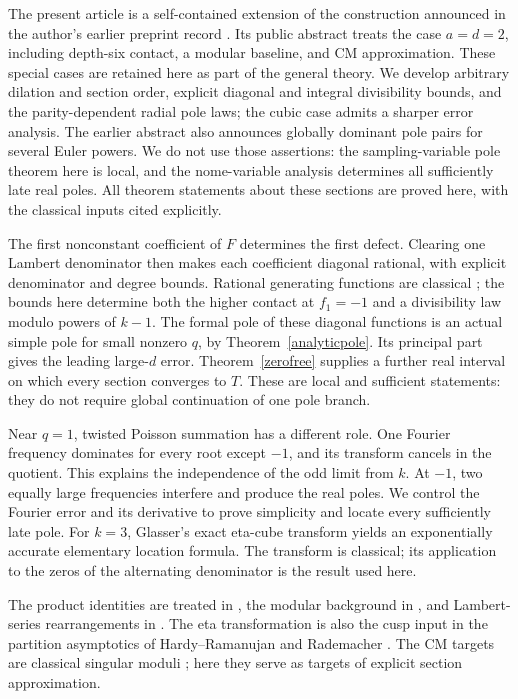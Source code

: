 \documentclass[11pt]{amsart}
\theoremstyle{definition}
\theoremstyle{remark}
\numberwithin{equation}{section}
\begin{document}
The present article is a self-contained extension of the construction announced in the author's earlier preprint record \cite{RaghavaEarlier}. Its public abstract treats the case $a=d=2$, including depth-six contact, a modular baseline, and CM approximation. These special cases are retained here as part of the general theory. We develop arbitrary dilation and section order, explicit diagonal and integral divisibility bounds, and the parity-dependent radial pole laws; the cubic case admits a sharper error analysis. The earlier abstract also announces globally dominant pole pairs for several Euler powers. We do not use those assertions: the sampling-variable pole theorem here is local, and the nome-variable analysis determines all sufficiently late real poles. All theorem statements about these sections are proved here, with the classical inputs cited explicitly.

The first nonconstant coefficient of $F$ determines the first defect. Clearing one Lambert denominator then makes each coefficient diagonal rational, with explicit denominator and degree bounds. Rational generating functions are classical \cite{Stanley,FlajoletSedgewick}; the bounds here determine both the higher contact at $f_1=-1$ and a divisibility law modulo powers of $k-1$. The formal pole of these diagonal functions is an actual simple pole for small nonzero $q$, by Theorem~\ref{analyticpole}. Its principal part gives the leading large-$d$ error. Theorem~\ref{zerofree} supplies a further real interval on which every section converges to $T$. These are local and sufficient statements: they do not require global continuation of one pole branch.

Near $q=1$, twisted Poisson summation has a different role. One Fourier frequency dominates for every root except $-1$, and its transform cancels in the quotient. This explains the independence of the odd limit from $k$. At $-1$, two equally large frequencies interfere and produce the real poles. We control the Fourier error and its derivative to prove simplicity and locate every sufficiently late pole. For $k=3$, Glasser's exact eta-cube transform \cite{Glasser,Coffey} yields an exponentially accurate elementary location formula. The transform is classical; its application to the zeros of the alternating denominator is the result used here.

The product identities are treated in \cite{Andrews,AndrewsAskeyRoy,GasperRahman}, the modular background in \cite{Apostol,Serre,DiamondShurman,KubertLang}, and Lambert-series rearrangements in \cite{Schmidt}. The eta transformation is also the cusp input in the partition asymptotics of Hardy--Ramanujan and Rademacher \cite{HardyRamanujan,Rademacher}. The CM targets are classical singular moduli \cite{Cox,Maier,Zagier}; here they serve as targets of explicit section approximation.
\end{document}
